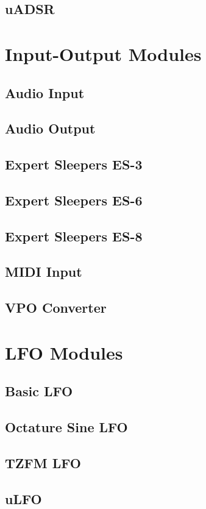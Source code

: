 \documentclass[11pt]{book}
\begin{document}
\section{uADSR}

\chapter{Input-Output Modules}
\section{Audio Input}
\section{Audio Output}
\section{Expert Sleepers ES-3}
\section{Expert Sleepers ES-6}
\section{Expert Sleepers ES-8}
\section{MIDI Input}
\section{VPO Converter}

\chapter{LFO Modules}
\section{Basic LFO}
\section{Octature Sine LFO}
\section{TZFM LFO}
\section{uLFO}
\end{document}
